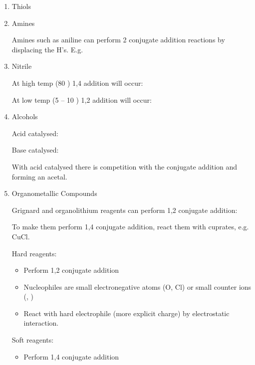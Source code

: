 \begin{enumerate}[label=\alph*)]

  \item Thiols

  \item Amines


    Amines such as aniline can perform 2 conjugate addition reactions by displacing
    the H's. E.g.


  \item Nitrile

    At high temp (80 \dec) 1,4 addition will occur:


    At low temp (5 -- 10 \dec) 1,2 addition will occur:

  \item Alcohols

    Acid catalysed:


    Base catalysed:


    With acid catalysed there is competition with the conjugate addition and forming
    an acetal.

  \item Organometallic Compounds

    Grignard and organolithium reagents can perform 1,2 conjugate addition:


    To make them perform 1,4 conjugate addition, react them with cuprates, e.g.
    CuCl.


    Hard reagents:
    \begin{itemize}
      \item Perform 1,2 conjugate addition

      \item Nucleophiles are small electronegative atoms (O, Cl) or small counter
        ions (, )

      \item React with hard electrophile (more explicit charge) by electrostatic
        interaction.
    \end{itemize}

    Soft reagents:
    \begin{itemize}
      \item Perform 1,4 conjugate addition


\end{itemize}
\end{enumerate}
